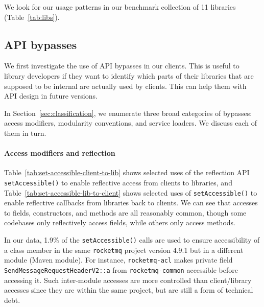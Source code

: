 We look for our usage patterns in our benchmark collection of 11 libraries (Table~\ref{tab:libs}).

\subsection{API bypasses}
We first investigate the use of API bypasses in our clients. This is useful to library developers if they want to identify which parts of their libraries that are supposed to be internal are actually used by clients. This can help them with API design in future versions. 

In Section~\ref{sec:classification}, we enumerate three broad categories
of bypasses: access modifiers, modularity conventions, and service loaders. We discuss each of them in turn.




\paragraph{Access modifiers and reflection}
Table~\ref{tab:set-accessible-client-to-lib}
shows selected uses of the reflection API \texttt{setAccessible()} to enable reflective access from clients to libraries,
and Table~\ref{tab:set-accessible-lib-to-client} shows selected uses of \texttt{setAccessible()} to enable reflective callbacks from libraries back to clients.
We can see that accesses to fields, constructors, and methods are all reasonably common, though some codebases only reflectively 
access fields, while others only access methods.

In our data, 1.9\% of the \texttt{setAccessible()} calls are 
used to ensure accessibility of a class member
in the same \texttt{rocketmq} project version 4.9.1 but in a different module (Maven module). 
For instance, \texttt{rocketmq-acl} makes private field \texttt{SendMessageRequestHeaderV2::a} from 
\texttt{rocketmq-common} accessible before accessing it. Such inter-module accesses are more controlled than client/library accesses since they are within the same project,
but are still a form of technical debt.

